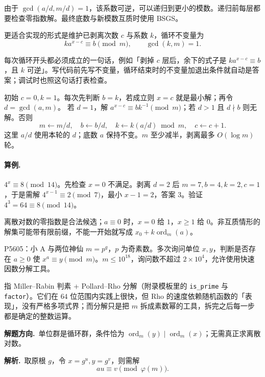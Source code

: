 \documentclass[UTF8,a4paper,11pt,twoside,openright,fontset=fandol]{ctexbook}
\theoremstyle{definition}
\newcommand{\ord}{\operatorname{ord}}
\newcommand{\sol}{\par\noindent\textbf{解析.}\ }
\newcommand{\hint}{\par\noindent\textbf{解题方向.}\ }
\begin{document}
由于 $\gcd(a/d,m/d)=1$，该系数可逆，可以递归到更小的模数。递归前每层都要检查零指数解。最终底数与新模数互质时使用 BSGS。


更适合实现的形式是维护已剥离次数 $c$ 与系数 $k$，循环不变量为
\[
 k a^{x-c}\equiv b\pmod m,\qquad\gcd(k,m)=1.
\]

\begin{tip}
每次循环开头都必须成立的一句话，例如「剥掉 $c$ 层后，余下的式子是 $ka^{x-c}\equiv b$，且 $k$ 可逆」。写代码前先写不变量，循环结束时的不变量加退出条件就自动是答案；调试时也照这句话打表检查。
\end{tip}

初始 $c=0,k=1$。每次先判断 $b=k$，若成立则 $x=c$ 就是最小解；再令 $d=\gcd(a,m)$。
若 $d=1$，解 $a^{x-c}\equiv bk^{-1}\pmod m$；若 $d>1$ 且 $d\nmid b$ 则无解。否则
\[
 m\gets m/d,\quad b\gets b/d,\quad
 k\gets k(a/d)\bmod m,\quad c\gets c+1.
\]
这里 $a/d$ 使用本轮的 $d$；底数 $a$ 保持不变。$m$ 至少减半，剥离最多 $O(\log m)$ 轮。

\paragraph{算例.} $4^x\equiv8\pmod{14}$。先检查 $x=0$ 不满足。剥离 $d=2$ 后 $m=7,b=4,k=2,c=1$，于是需解 $4^{x-1}\equiv2\pmod7$，最小 $x-1=2$，答案 $3$。验证 $4^3=64\equiv8\pmod{14}$。
\begin{pitfall}
离散对数的零指数是合法候选；$a\equiv0$ 时，$x=0$ 给 $1$，$x\ge1$ 给 $0$。非互质情形的解集可能带有限前缀，不能一开始就写成 $x_0+k\ord_m(a)$。
\end{pitfall}


\begin{problem}{P5605：小 A 与两位神仙}
$m=p^q$，$p$ 为奇素数。多次询问单位 $x,y$，判断是否存在 $a\ge0$ 使 $x^a\equiv y\pmod m$。$m\le10^{18}$，询问数不超过 $2\times10^4$，允许使用快速因数分解工具。
\end{problem}

\begin{tip}
指 Miller--Rabin 判素 + Pollard--Rho 分解（附录模板里的 \texttt{is\_prime} 与 \texttt{factor}）。它们在 $64$ 位范围内实践上很快，但 Rho 的速度依赖随机函数的「表现」，没有严格多项式界；而分解只是把 $m$ 拆成素数幂的工具，拆完之后每一步都是确定的整数运算。
\end{tip}

\hint 单位群是循环群，条件恰为 $\ord_m(y)\mid\ord_m(x)$；无需真正求离散对数。

\sol 取原根 $g$，令 $x=g^u,y=g^v$，则需解
\[
 au\equiv v\pmod{\varphi(m)}.
\]
\end{document}
